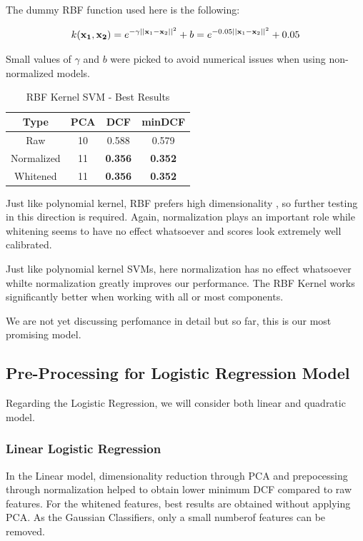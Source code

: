 \documentclass[12pt, twocolumn]{article}
\begin{document}
The dummy RBF function used here is the following:

$$\displaystyle k({\bf x_1}, {\bf x_2}) = e^{-\gamma||{\bf x}_1 - {\bf x}_2||^2} + b = e^{-0.05||{\bf x}_1 - {\bf x}_2||^2} + 0.05 $$

Small values of $\gamma$ and $b$ were picked to avoid numerical issues when using non-normalized models.

\begin{table}[H]
    \centering
        \begin{tabular}{||c|c|c|c||}
            \hline
            Type & PCA & DCF & minDCF \\
            \hline
            \hline
                Raw & 10 & 0.588 & 0.579 \\ 
                Normalized & 11 & {\bf 0.356} & {\bf 0.352} \\ 
                Whitened & 11 & {\bf 0.356} & {\bf 0.352} \\ 
            \hline
    \end{tabular}
    \caption{RBF Kernel SVM - Best Results}
\end{table}

Just like polynomial kernel, RBF prefers high dimensionality , so further testing in this direction is required.
Again, normalization plays an important role while whitening seems to have no effect whatsoever and scores look extremely well calibrated.

Just like polynomial kernel SVMs, here normalization has no effect whatsoever whilte normalization greatly improves our performance.
The RBF Kernel works significantly better when working with all or most components. 

We are not yet discussing perfomance in detail but so far, this is our most promising model.

\subsection{Pre-Processing for Logistic Regression Model}

Regarding the Logistic Regression, we will consider both linear and quadratic model.

\subsubsection{Linear Logistic Regression}

In the Linear model, dimensionality reduction through PCA and prepocessing through normalization
helped to obtain lower minimum DCF compared to raw features.
For the whitened features, best results are obtained without applying PCA.
As the Gaussian Classifiers, only a small numberof features can be removed.
\end{document}
